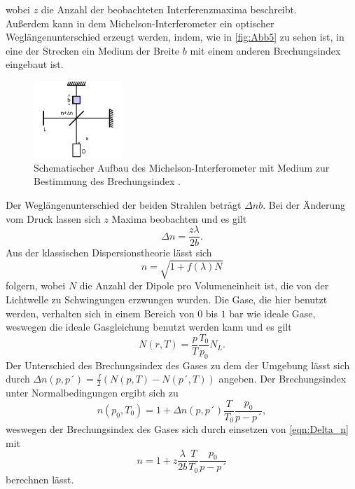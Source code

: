 wobei $z$ die Anzahl der beobachteten Interferenzmaxima beschreibt.\\
Außerdem kann in dem Michelson-Interferometer ein optischer Weglängenunterschied erzeugt werden, indem, wie in \autoref{fig:Abb5} zu sehen ist,
in eine der Strecken ein Medium der Breite $b$ mit einem anderen Brechungsindex eingebaut ist.
\begin{figure}[H]
    \centering
    \includegraphics[width=0.3\textwidth]{build/Abb5.PNG}
    \caption {Schematischer Aufbau des Michelson-Interferometer mit Medium zur Bestimmung des Brechungsindex \cite[3]{V401}.}
    \label{fig:Abb5}
\end{figure}
Der Weglängenunterschied der beiden Strahlen beträgt $\Delta n b$. 
Bei der Änderung vom Druck lassen sich $z$ Maxima beobachten und es gilt
\begin{equation}
    \Delta n =\frac{z \lambda}{2b}.
    \label{eqn:Delta_n}
\end{equation}
Aus der klassischen Dispersionstheorie lässt sich
\begin{equation*}
    n = \sqrt{1 + f(\lambda)N}
\end{equation*}
folgern, wobei $N$ die Anzahl der Dipole pro Volumeneinheit ist, die von der Lichtwelle zu Schwingungen erzwungen wurden.
Die Gase, die hier benutzt werden, verhalten sich in einem Bereich von $0$ bis $1$ bar wie ideale Gase, weswegen die ideale Gasgleichung benutzt werden kann und es gilt
\begin{equation*}
    N(r,T) = \frac{p}{T}\frac{T_0}{p_0}N_L.
\end{equation*}
Der Unterschied des Brechungsindex des Gases zu dem der Umgebung lässt sich durch $\Delta n(p,p´) = \frac{f}{2}(N(p,T)-N(p´,T))$ angeben.
Der Brechungsindex unter Normalbedingungen ergibt sich zu 
\begin{equation}
    n(p_0,T_0) = 1 + \Delta n(p,p´)\frac{T}{T_0}\frac{p_0}{p-p´},
    \label{eqn:Normalbedingungen}
\end{equation}
weswegen der Brechungsindex des Gases sich durch einsetzen von \autoref{eqn:Delta_n} mit
\begin{equation}
    n = 1 + z \frac{\lambda}{2b} \frac{T}{T_0} \frac{p_0}{p-p´}
    \label{eqn:n}
\end{equation}
berechnen lässt.